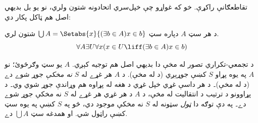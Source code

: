 \documentclass[../../../include/open-logic-section]{subfiles}
\begin{document}

 تقاطعګانې راکړې.
خو که غواړو چې خپل‌سري اتحادونه شتون ولري، نو يو بل بديهي
اصل هم ټاکل پکار دي:

\begin{axiom}[اتحاد] د هر سټ $A$ دپاره سټ $\bigcup A =
\Setabs{x}{(\exists b \in A) x \in b}$ شتون لري.
\[
	\forall A \exists U \forall x(x \in U \liff (\exists b \in A)x \in b)
\]
\end{axiom}

د تجمعي-تکراري تصور له مخې دا بديهي اصل هم توجيه کېږي.
$A$ يو سټ وګرځوئ؛ نو $A$ په يوه پړاو $S$ کښې جوړېږي
(د \stageshier له مخې). د $A$ هر غړے له $S$ \emph{نه مخکې}
جوړ شوے دے (د \stagesacc له مخې)۔ د هر داسې غړي خپل
غړي د هغه له پړاوه هم وړاندې جوړ شوي وي۔ د پړاوونو د
ترتيب د انتقاليت له مخې، د $A$ د هر غړي هر غړے له $S$
نه مخکې جوړ شوے دے۔
په دې توګه دا \emph{ټول} سټونه له $S$ نه مخکې موجود دي،
څو په $S$ کښې په يوه سټ کښې راټول شي. او همدغه سټ $\bigcup A$ دے.
\end{document}
